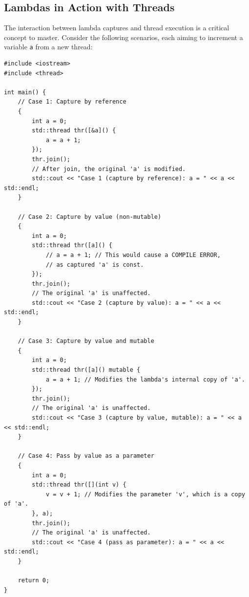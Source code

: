 \documentclass{article} %
\begin{document}
\subsection{Lambdas in Action with Threads}
The interaction between lambda captures and thread execution is a critical concept to master. Consider the following scenarios, each aiming to increment a variable \texttt{a} from a new thread:
\begin{verbatim}
#include <iostream>
#include <thread>

int main() {
    // Case 1: Capture by reference
    {
        int a = 0;
        std::thread thr([&a]() {
            a = a + 1;
        });
        thr.join();
        // After join, the original 'a' is modified.
        std::cout << "Case 1 (capture by reference): a = " << a << std::endl;
    }

    // Case 2: Capture by value (non-mutable)
    {
        int a = 0;
        std::thread thr([a]() {
            // a = a + 1; // This would cause a COMPILE ERROR, 
            // as captured 'a' is const.
        });
        thr.join();
        // The original 'a' is unaffected.
        std::cout << "Case 2 (capture by value): a = " << a << std::endl;
    }
    
    // Case 3: Capture by value and mutable
    {
        int a = 0;
        std::thread thr([a]() mutable {
            a = a + 1; // Modifies the lambda's internal copy of 'a'.
        });
        thr.join();
        // The original 'a' is unaffected.
        std::cout << "Case 3 (capture by value, mutable): a = " << a << std::endl;
    }
    
    // Case 4: Pass by value as a parameter
    {
        int a = 0;
        std::thread thr([](int v) {
            v = v + 1; // Modifies the parameter 'v', which is a copy of 'a'.
        }, a);
        thr.join();
        // The original 'a' is unaffected.
        std::cout << "Case 4 (pass as parameter): a = " << a << std::endl;
    }

    return 0;
}
\end{verbatim}
\end{document}

